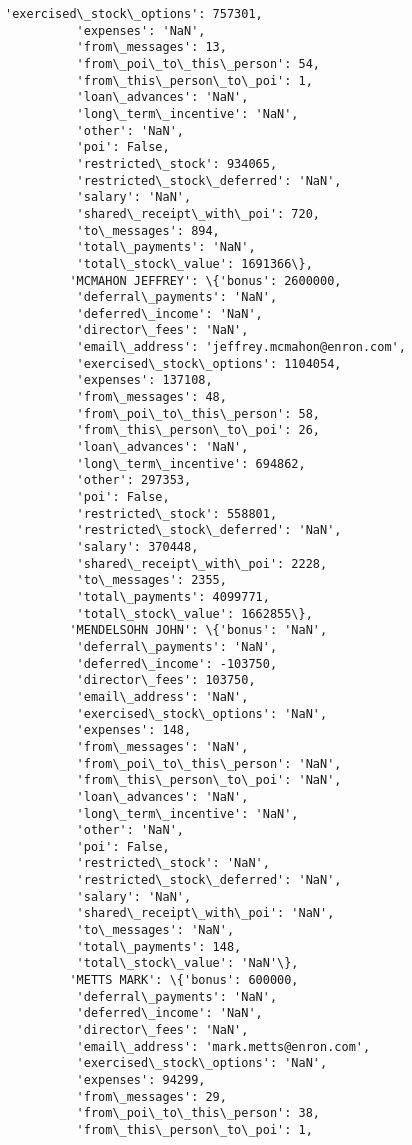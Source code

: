 \documentclass[11pt]{article}
\begin{document}
\begin{Verbatim}[commandchars=\\\{\}]
          'exercised\_stock\_options': 757301,
          'expenses': 'NaN',
          'from\_messages': 13,
          'from\_poi\_to\_this\_person': 54,
          'from\_this\_person\_to\_poi': 1,
          'loan\_advances': 'NaN',
          'long\_term\_incentive': 'NaN',
          'other': 'NaN',
          'poi': False,
          'restricted\_stock': 934065,
          'restricted\_stock\_deferred': 'NaN',
          'salary': 'NaN',
          'shared\_receipt\_with\_poi': 720,
          'to\_messages': 894,
          'total\_payments': 'NaN',
          'total\_stock\_value': 1691366\},
         'MCMAHON JEFFREY': \{'bonus': 2600000,
          'deferral\_payments': 'NaN',
          'deferred\_income': 'NaN',
          'director\_fees': 'NaN',
          'email\_address': 'jeffrey.mcmahon@enron.com',
          'exercised\_stock\_options': 1104054,
          'expenses': 137108,
          'from\_messages': 48,
          'from\_poi\_to\_this\_person': 58,
          'from\_this\_person\_to\_poi': 26,
          'loan\_advances': 'NaN',
          'long\_term\_incentive': 694862,
          'other': 297353,
          'poi': False,
          'restricted\_stock': 558801,
          'restricted\_stock\_deferred': 'NaN',
          'salary': 370448,
          'shared\_receipt\_with\_poi': 2228,
          'to\_messages': 2355,
          'total\_payments': 4099771,
          'total\_stock\_value': 1662855\},
         'MENDELSOHN JOHN': \{'bonus': 'NaN',
          'deferral\_payments': 'NaN',
          'deferred\_income': -103750,
          'director\_fees': 103750,
          'email\_address': 'NaN',
          'exercised\_stock\_options': 'NaN',
          'expenses': 148,
          'from\_messages': 'NaN',
          'from\_poi\_to\_this\_person': 'NaN',
          'from\_this\_person\_to\_poi': 'NaN',
          'loan\_advances': 'NaN',
          'long\_term\_incentive': 'NaN',
          'other': 'NaN',
          'poi': False,
          'restricted\_stock': 'NaN',
          'restricted\_stock\_deferred': 'NaN',
          'salary': 'NaN',
          'shared\_receipt\_with\_poi': 'NaN',
          'to\_messages': 'NaN',
          'total\_payments': 148,
          'total\_stock\_value': 'NaN'\},
         'METTS MARK': \{'bonus': 600000,
          'deferral\_payments': 'NaN',
          'deferred\_income': 'NaN',
          'director\_fees': 'NaN',
          'email\_address': 'mark.metts@enron.com',
          'exercised\_stock\_options': 'NaN',
          'expenses': 94299,
          'from\_messages': 29,
          'from\_poi\_to\_this\_person': 38,
          'from\_this\_person\_to\_poi': 1,

\end{Verbatim}
\end{document}
